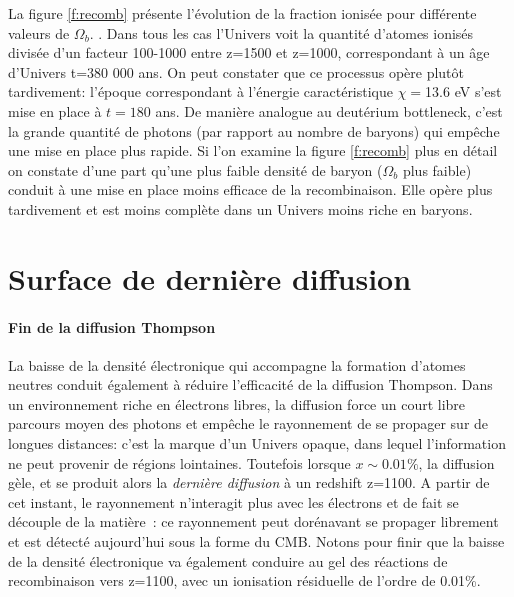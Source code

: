 La figure \ref{f:recomb} présente l'évolution de la fraction ionisée pour différente valeurs de $\Omega_b$. . Dans tous les cas l'Univers voit la quantité d'atomes ionisés divisée d'un facteur 100-1000 entre z=1500 et z=1000, correspondant à un âge d'Univers t=380 000 ans. On peut constater que ce processus opère plutôt tardivement: l'époque correspondant à l'énergie caractéristique $\chi=$13.6 eV s'est mise en place à $t=180$ ans. De manière analogue au deutérium bottleneck, c'est la grande quantité de photons (par rapport au nombre de baryons) qui empêche une mise en place plus rapide. Si l'on examine la figure \ref{f:recomb} plus en détail on constate d'une part qu'une plus faible densité de baryon ($\Omega_b$ plus faible) conduit à une mise en place moins efficace de la recombinaison. Elle opère plus tardivement et est moins complète dans un Univers moins riche en baryons.

\section{Surface de dernière diffusion}

\paragraph{Fin de la diffusion Thompson} La baisse de la densité électronique qui accompagne la formation d'atomes neutres conduit également à réduire l'efficacité de la diffusion Thompson. Dans un environnement riche en électrons libres, la diffusion force un court libre parcours moyen des photons et empêche le rayonnement de se propager sur de longues distances: c'est la marque d'un Univers opaque, dans lequel l'information ne peut provenir de régions lointaines.  Toutefois lorsque $x\sim 0.01\%$, la diffusion gèle, et se produit alors la \textit{dernière diffusion} à un redshift z=1100. A partir de cet instant, le rayonnement n'interagit plus avec les électrons et de fait se découple de la matière~: ce rayonnement peut dorénavant se propager librement et est détecté aujourd'hui sous la forme du CMB. Notons pour finir que la baisse de la densité électronique va également conduire au gel des réactions de recombinaison vers z=1100, avec un ionisation résiduelle de l'ordre de 0.01\%.

